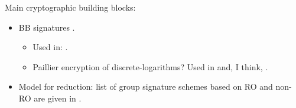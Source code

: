 Main cryptographic building blocks:

\begin{itemize}
\item BB signatures \cite{bb04}.
  \begin{itemize}
  \item Used in: \cite{ky05}.
  \item Paillier encryption of discrete-logarithms? Used in \cite{ky05} and,
    I think, \cite{gl19}.    
  \end{itemize}
\item Model for reduction: list of group signature schemes based on RO and
  non-RO are given in \cite{bcc+16}.
\end{itemize}
